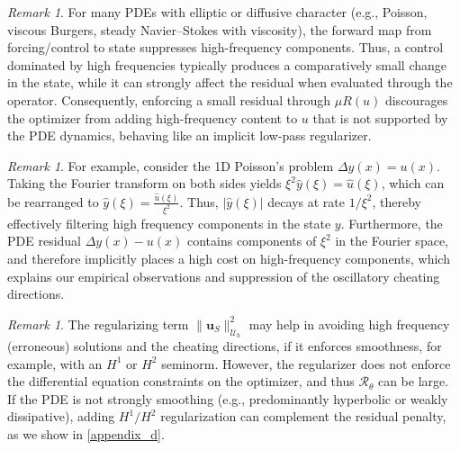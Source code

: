 \documentclass[final,1p,times]{elsarticle}
\theoremstyle{plain} %
\theoremstyle{definition} %
\theoremstyle{remark} %
\newtheorem{remark}[theorem]{Remark}
\begin{document}
\begin{remark}\label{rem:filtering}
For many PDEs with elliptic or diffusive character (e.g., Poisson, viscous Burgers, steady Navier--Stokes with viscosity), the forward map from forcing/control to state suppresses high-frequency components. Thus, a control dominated by high frequencies typically produces a comparatively small change in the state, while it can strongly affect the residual when evaluated through the operator. Consequently, enforcing a small residual through $\mu R(u)$ discourages the optimizer from adding high-frequency content to $u$ that is not supported by the PDE dynamics, behaving like an implicit low-pass regularizer.
\end{remark}
\begin{remark}\label{remark:smoothness}
For example, consider the 1D Poisson's problem $\Delta y(x)=u(x)$. Taking the Fourier transform on both sides yields $\xi^2\widehat{y}(\xi)=\widehat{u}(\xi)$, which can be rearranged to $\widehat{y}(\xi)=\frac{\widehat{u}(\xi)}{\xi^2}$. Thus, $|\widehat{y}(\xi)|$ decays at rate $1/\xi^2$, thereby effectively filtering high frequency components in the state $y$. Furthermore, the PDE residual $\Delta y(x)-u(x)$ contains components of $\xi^2$ in the Fourier space, and therefore implicitly places a high cost on high-frequency components, which explains our empirical observations and suppression of the oscillatory cheating directions.
\end{remark}

\begin{remark}\label{rem:regularization}
The regularizing term $\|\mathbf{u}_S\|_{\mathcal{U}_h}^2$ may help in avoiding high frequency (erroneous) solutions and the cheating directions, if it enforces smoothness, for example, with an $H^1$ or $H^2$ seminorm. However, the regularizer does not enforce the differential equation constraints on the optimizer, and thus $\mathcal{R}_\theta$ can be large. If the PDE is not strongly smoothing (e.g., predominantly hyperbolic or weakly dissipative), adding $H^1/H^2$ regularization can complement the residual penalty, as we show in \ref{appendix_d}.
\end{remark}
\end{document}
